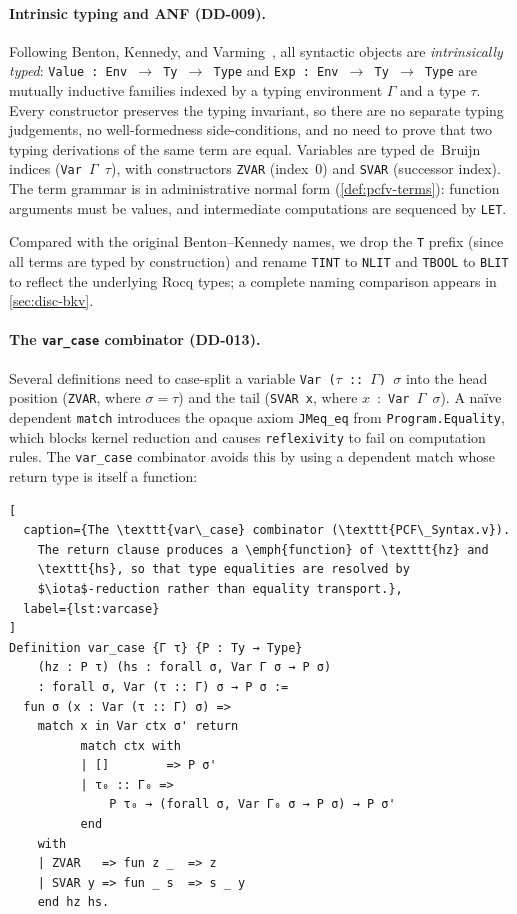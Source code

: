 
\paragraph{Intrinsic typing and ANF (DD-009).}
Following Benton, Kennedy, and Varming~\cite{BKV2009}, all syntactic
objects are \emph{intrinsically typed}: \texttt{Value~:~Env~$\to$~Ty~$\to$~Type}
and \texttt{Exp~:~Env~$\to$~Ty~$\to$~Type} are mutually inductive
families indexed by a typing environment $\Gamma$ and a type $\tau$.
Every constructor preserves the typing invariant, so there are no
separate typing judgements, no well-formedness side-conditions, and no
need to prove that two typing derivations of the same term are equal.
Variables are typed de~Bruijn indices (\texttt{Var~$\Gamma$~$\tau$}),
with constructors \texttt{ZVAR} (index~$0$) and \texttt{SVAR}
(successor index).  The term grammar is in administrative normal form
(\cref{def:pcfv-terms}): function arguments must be values, and
intermediate computations are sequenced by \texttt{LET}.

Compared with the original Benton--Kennedy names, we drop the
\texttt{T} prefix (since all terms are typed by construction) and rename
\texttt{TINT} to \texttt{NLIT} and \texttt{TBOOL} to \texttt{BLIT}
to reflect the underlying Rocq types; a complete naming comparison
appears in \cref{sec:disc-bkv}.

\paragraph{The \texttt{var\_case} combinator (DD-013).}
Several definitions need to case-split a variable
\texttt{Var~($\tau$~::~$\Gamma$)~$\sigma$} into the head position
(\texttt{ZVAR}, where $\sigma = \tau$) and the tail (\texttt{SVAR~x},
where $x$~:~\texttt{Var~$\Gamma$~$\sigma$}).  A na\"ive dependent
\texttt{match} introduces the opaque axiom \texttt{JMeq\_eq} from
\texttt{Program.Equality}, which blocks kernel reduction and causes
\texttt{reflexivity} to fail on computation rules.  The
\texttt{var\_case} combinator avoids this by using a dependent match
whose return type is itself a function:

\begin{lstlisting}[
  caption={The \texttt{var\_case} combinator (\texttt{PCF\_Syntax.v}).
    The return clause produces a \emph{function} of \texttt{hz} and
    \texttt{hs}, so that type equalities are resolved by
    $\iota$-reduction rather than equality transport.},
  label={lst:varcase}
]
Definition var_case {Γ τ} {P : Ty → Type}
    (hz : P τ) (hs : forall σ, Var Γ σ → P σ)
    : forall σ, Var (τ :: Γ) σ → P σ :=
  fun σ (x : Var (τ :: Γ) σ) =>
    match x in Var ctx σ' return
          match ctx with
          | []        => P σ'
          | τ₀ :: Γ₀ =>
              P τ₀ → (forall σ, Var Γ₀ σ → P σ) → P σ'
          end
    with
    | ZVAR   => fun z _  => z
    | SVAR y => fun _ s  => s _ y
    end hz hs.
\end{lstlisting}

